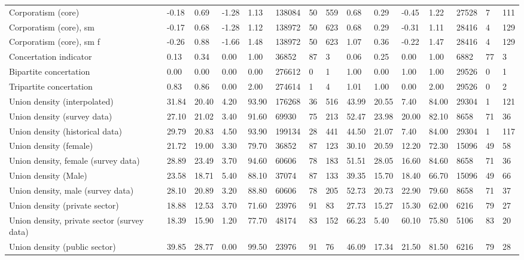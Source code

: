 \begin{longtable}{lllllllllllllll}
Corporatism (core) & -0.18 & 0.69 & -1.28 & 1.13 & 138084 & 50 & 559 & 0.68 & 0.29 & -0.45 & 1.22 & 27528 & 7 & 111\\
\addlinespace
Corporatism (core), sm & -0.17 & 0.68 & -1.28 & 1.12 & 138972 & 50 & 623 & 0.68 & 0.29 & -0.31 & 1.11 & 28416 & 4 & 129\\
Corporatism (core), sm f & -0.26 & 0.88 & -1.66 & 1.48 & 138972 & 50 & 623 & 1.07 & 0.36 & -0.22 & 1.47 & 28416 & 4 & 129\\
Concertation indicator & 0.13 & 0.34 & 0.00 & 1.00 & 36852 & 87 & 3 & 0.06 & 0.25 & 0.00 & 1.00 & 6882 & 77 & 3\\
Bipartite concertation & 0.00 & 0.00 & 0.00 & 0.00 & 276612 & 0 & 1 & 1.00 & 0.00 & 1.00 & 1.00 & 29526 & 0 & 1\\
Tripartite concertation & 0.83 & 0.86 & 0.00 & 2.00 & 274614 & 1 & 4 & 1.01 & 1.00 & 0.00 & 2.00 & 29526 & 0 & 2\\
\addlinespace
Union density (interpolated) & 31.84 & 20.40 & 4.20 & 93.90 & 176268 & 36 & 516 & 43.99 & 20.55 & 7.40 & 84.00 & 29304 & 1 & 121\\
Union density (survey data) & 27.10 & 21.02 & 3.40 & 91.60 & 69930 & 75 & 213 & 52.47 & 23.98 & 20.00 & 82.10 & 8658 & 71 & 36\\
Union density (historical data) & 29.79 & 20.83 & 4.50 & 93.90 & 199134 & 28 & 441 & 44.50 & 21.07 & 7.40 & 84.00 & 29304 & 1 & 117\\
Union density (female) & 21.72 & 19.00 & 3.30 & 79.70 & 36852 & 87 & 123 & 30.10 & 20.59 & 12.20 & 72.30 & 15096 & 49 & 58\\
Union density, female (survey data) & 28.89 & 23.49 & 3.70 & 94.60 & 60606 & 78 & 183 & 51.51 & 28.05 & 16.60 & 84.60 & 8658 & 71 & 36\\
\addlinespace
Union density (Male) & 23.58 & 18.71 & 5.40 & 88.10 & 37074 & 87 & 133 & 39.35 & 15.70 & 18.40 & 66.70 & 15096 & 49 & 66\\
Union density, male (survey data) & 28.10 & 20.89 & 3.20 & 88.80 & 60606 & 78 & 205 & 52.73 & 20.73 & 22.90 & 79.60 & 8658 & 71 & 37\\
Union density (private sector) & 18.88 & 12.53 & 3.70 & 71.60 & 23976 & 91 & 83 & 27.73 & 15.27 & 15.30 & 62.00 & 6216 & 79 & 27\\
Union density, private sector (survey data) & 18.39 & 15.90 & 1.20 & 77.70 & 48174 & 83 & 152 & 66.23 & 5.40 & 60.10 & 75.80 & 5106 & 83 & 20\\
Union density (public sector) & 39.85 & 28.77 & 0.00 & 99.50 & 23976 & 91 & 76 & 46.09 & 17.34 & 21.50 & 81.50 & 6216 & 79 & 28\\

\end{longtable}
